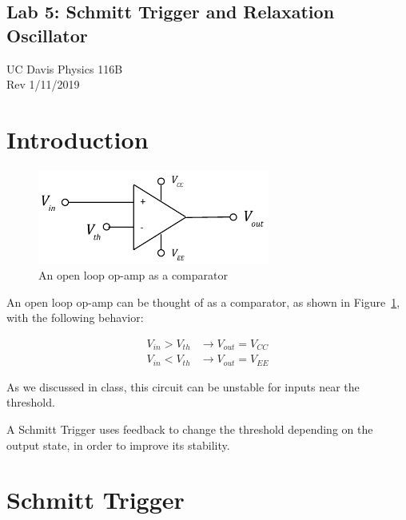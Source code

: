\documentclass[12pt]{article}
\begin{document}




\begin{center}
\section*{Lab 5: Schmitt Trigger and Relaxation Oscillator}
UC Davis Physics 116B\\
Rev 1/11/2019\\
\end{center}

\section*{Introduction}

\begin{figure}[!h]
\centerline{\includegraphics[width=3in]{figs/comparator.pdf}}
\caption{An open loop op-amp as a comparator}
\label{fig:comparator}
\end{figure}

An open loop op-amp can be thought of as a comparator, as shown in Figure~\ref{fig:comparator}, with the following behavior:

\begin{align*}
V_{in}>V_{th} & \rightarrow V_{out}=V_{CC}\\
V_{in}<V_{th}& \rightarrow V_{out}=V_{EE}
\end{align*}

As we discussed in class, this circuit can be unstable for inputs near the threshold.

A Schmitt Trigger uses feedback to change the threshold depending on the output state, in order to
improve its stability.

\section*{Schmitt Trigger}
\end{document}
